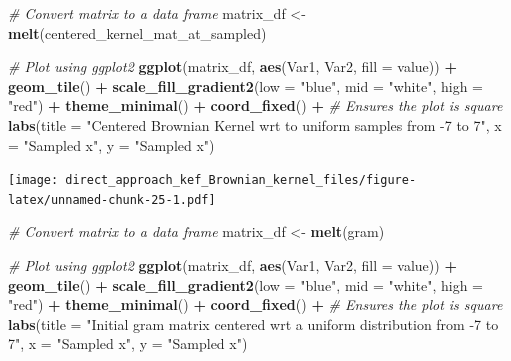 \documentclass[
]{article}
\newenvironment{Shaded}{\begin{snugshade}}{\end{snugshade}}
\newcommand{\AttributeTok}[1]{\textcolor[rgb]{0.13,0.29,0.53}{#1}}
\newcommand{\CommentTok}[1]{\textcolor[rgb]{0.56,0.35,0.01}{\textit{#1}}}
\newcommand{\FunctionTok}[1]{\textcolor[rgb]{0.13,0.29,0.53}{\textbf{#1}}}
\newcommand{\NormalTok}[1]{#1}
\newcommand{\OtherTok}[1]{\textcolor[rgb]{0.56,0.35,0.01}{#1}}
\newcommand{\SpecialCharTok}[1]{\textcolor[rgb]{0.81,0.36,0.00}{\textbf{#1}}}
\newcommand{\StringTok}[1]{\textcolor[rgb]{0.31,0.60,0.02}{#1}}
\begin{document}
\begin{Shaded}
\begin{Highlighting}[]
\CommentTok{\# Convert matrix to a data frame}
\NormalTok{matrix\_df }\OtherTok{\textless{}{-}} \FunctionTok{melt}\NormalTok{(centered\_kernel\_mat\_at\_sampled)}

\CommentTok{\# Plot using ggplot2}
\FunctionTok{ggplot}\NormalTok{(matrix\_df, }\FunctionTok{aes}\NormalTok{(Var1, Var2, }\AttributeTok{fill =}\NormalTok{ value)) }\SpecialCharTok{+}
  \FunctionTok{geom\_tile}\NormalTok{() }\SpecialCharTok{+}
  \FunctionTok{scale\_fill\_gradient2}\NormalTok{(}\AttributeTok{low =} \StringTok{"blue"}\NormalTok{, }\AttributeTok{mid =} \StringTok{"white"}\NormalTok{, }\AttributeTok{high =} \StringTok{"red"}\NormalTok{) }\SpecialCharTok{+}
  \FunctionTok{theme\_minimal}\NormalTok{() }\SpecialCharTok{+}
  \FunctionTok{coord\_fixed}\NormalTok{() }\SpecialCharTok{+}  \CommentTok{\# Ensures the plot is square}
  \FunctionTok{labs}\NormalTok{(}\AttributeTok{title =} \StringTok{"Centered Brownian Kernel wrt to uniform samples from {-}7 to 7"}\NormalTok{, }\AttributeTok{x =} \StringTok{"Sampled x"}\NormalTok{, }\AttributeTok{y =} \StringTok{"Sampled x"}\NormalTok{)}
\end{Highlighting}
\end{Shaded}

\texttt{[image: direct\_approach\_kef\_Brownian\_kernel\_files/figure-latex/unnamed-chunk-25-1.pdf]}

\begin{Shaded}
\begin{Highlighting}[]
\CommentTok{\# Convert matrix to a data frame}
\NormalTok{matrix\_df }\OtherTok{\textless{}{-}} \FunctionTok{melt}\NormalTok{(gram)}

\CommentTok{\# Plot using ggplot2}
\FunctionTok{ggplot}\NormalTok{(matrix\_df, }\FunctionTok{aes}\NormalTok{(Var1, Var2, }\AttributeTok{fill =}\NormalTok{ value)) }\SpecialCharTok{+}
  \FunctionTok{geom\_tile}\NormalTok{() }\SpecialCharTok{+}
  \FunctionTok{scale\_fill\_gradient2}\NormalTok{(}\AttributeTok{low =} \StringTok{"blue"}\NormalTok{, }\AttributeTok{mid =} \StringTok{"white"}\NormalTok{, }\AttributeTok{high =} \StringTok{"red"}\NormalTok{) }\SpecialCharTok{+}
  \FunctionTok{theme\_minimal}\NormalTok{() }\SpecialCharTok{+}
  \FunctionTok{coord\_fixed}\NormalTok{() }\SpecialCharTok{+}  \CommentTok{\# Ensures the plot is square}
  \FunctionTok{labs}\NormalTok{(}\AttributeTok{title =} \StringTok{"Initial gram matrix centered wrt a uniform distribution from {-}7 to 7"}\NormalTok{, }\AttributeTok{x =} \StringTok{"Sampled x"}\NormalTok{, }\AttributeTok{y =} \StringTok{"Sampled x"}\NormalTok{)}
\end{Highlighting}
\end{Shaded}
\end{document}
